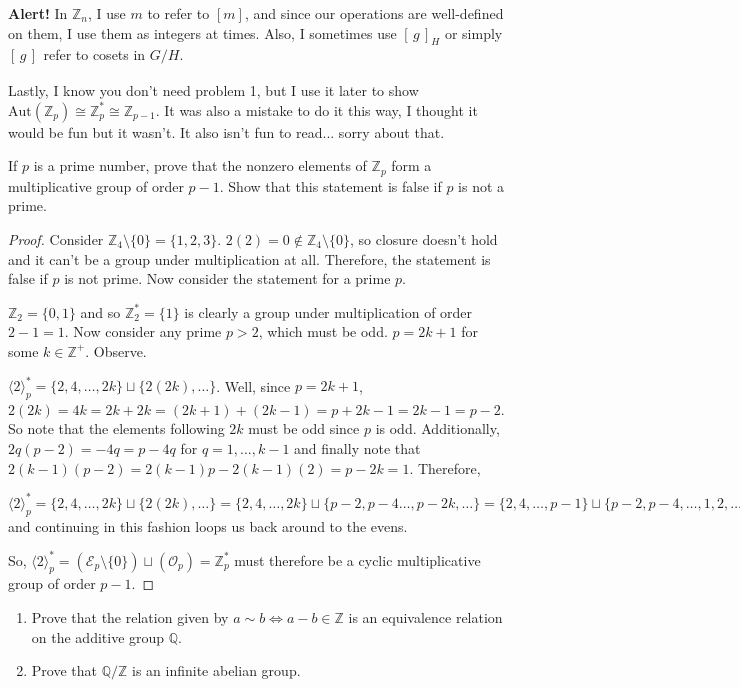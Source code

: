 \documentclass[addpoints,10pt]{exam}
\theoremstyle{plain}
\theoremstyle{definition}
\newtheorem{prob}[thm]{Problem}
\theoremstyle{plain}
\theoremstyle{plain}
\theoremstyle{definition}
\let\oldprob\prob
\let\endoldprob\endprob
\renewenvironment{prob}
  {\begin{singlespace}\oldprob}
  {\endoldprob\end{singlespace}}
\newcommand{\belowtitle}{\leavevmode\newline}
\newcommand{\class}[2][]{\ensuremath{\left[\,#2\,\right]_{#1}}}
\newcommand{\ZZ}{\ensuremath{\mathbb{Z}}}
\begin{document}
\textbf{Alert!} In $\ZZ_{n}$, I use $m$ to refer to $[m]$, and since our operations are well-defined on them, I use them as integers at times. Also, I sometimes use $\class[H]{g}$ or simply $\class{g}$ refer to cosets in $G/H$.

Lastly, I know you don't need problem 1, but I use it later to show $\mathrm{Aut}(\ZZ_{p})\cong \ZZ_{p}^{*}\cong \ZZ_{p-1}$. It was also a mistake to do it this way, I thought it would be fun but it wasn't. It also isn't fun to read... sorry about that.
\begin{prob}
  If $p$ is a prime number, prove that the nonzero elements of $\mathbb{Z}_p$ form a multiplicative group of order $p-1$. Show that this statement is false if $p$ is not a prime. 
\end{prob}

    \begin{proof} Consider $\ZZ_{4}\setminus\{0\}=\{1,2,3\}$. $2(2)=0\not\in \ZZ_{4}\setminus\{0\}$, so closure doesn't hold and it can't be a group under multiplication at all. Therefore, the statement is false if $p$ is not prime. Now consider the statement for a prime $p$.
        
    $\ZZ_{2}=\{0,1\}$ and so $\ZZ^{*}_{2}=\{1\}$ is clearly a group under multiplication of order $2-1=1$. Now consider any prime $p>2$, which must be odd. $p=2k+1$ for some $k\in \ZZ^{+}$. Observe.

    $\langle 2\rangle^{*}_{p}=\{2,4,\hdots, 2k\}\sqcup \{2(2k),\hdots\}$. Well, since $p=2k+1$, $2(2k)=4k=2k+2k=(2k+1)+(2k-1)=p+2k-1=2k-1=p-2$. So note that the elements following $2k$ must be odd since $p$ is odd. Additionally, $2q(p-2)=-4q=p-4q$ for $q=1,\hdots, k-1$ and finally note that $2(k-1)(p-2)=2(k-1)p-2(k-1)(2)=p-2k=1$. Therefore,

    $\langle 2\rangle^{*}_{p}=\{2,4,\hdots, 2k\}\sqcup \{2(2k),\hdots\}=\{2,4,\hdots, 2k\}\sqcup \{p-2,p-4\hdots,p-2k,\hdots\}=\{2,4,\hdots,p-1\}\sqcup \{p-2,p-4,\hdots,1,2,\hdots\}$ and continuing in this fashion loops us back around to the evens.

    So, $\langle 2\rangle^{*}_{p}=(\mathcal{E}_{p}\setminus\{0\})\sqcup (\mathcal{O}_{p})=\ZZ^{*}_{p}$ must therefore be a cyclic multiplicative group of order $p-1$.

\end{proof}
\newpage

\setcounter{thm}{1}   %
\begin{prob}\belowtitle
  \begin{enumerate}[label=(\alph*)]
    \item Prove that the relation given by $a \sim b \iff a - b \in \mathbb{Z}$ is an equivalence relation on the additive group $\mathbb{Q}$.
    \item Prove that $\mathbb{Q}/\mathbb{Z}$ is an infinite abelian group.
  \end{enumerate}
\end{prob}
\end{document}
